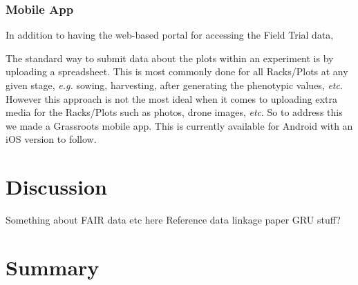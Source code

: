 \documentclass[12pt,a4paper]{extarticle}
\begin{document}
\subsubsection*{Mobile App}


In addition to having the web-based portal for accessing the Field Trial data,

The standard way to submit data about the plots within an experiment is by uploading a spreadsheet. 
This is most commonly done for all Racks/Plots at any given stage, \textit{e.g.} sowing, harvesting, after generating the phenotypic values, \textit{etc}.
However this approach is not the most ideal when it comes to uploading extra media for the Racks/Plots such as photos, drone images, \textit{etc}.
So to address this we made a Grassroots mobile app. 
This is currently available for Android with an iOS version to follow. 
\section*{Discussion} %

Something about FAIR data etc here
Reference data linkage paper
GRU stuff?




\section*{Summary} %

\end{document}
